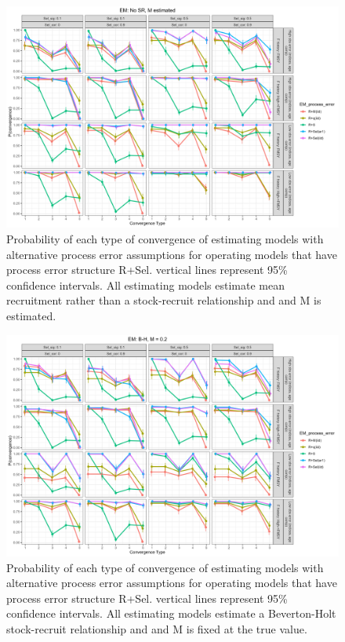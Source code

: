 \documentclass[
  12pt,
]{article}
\begin{document}
\begin{landscape}
\begin{figure}
\caption{Probability of each type of convergence of estimating models with alternative process error assumptions for operating models that have process error structure R+Sel. vertical lines represent 95\% confidence intervals. All estimating models estimate mean recruitment rather than a stock-recruit relationship and and M is estimated.}\label{Sel_om_em_R_ME_convergence}
\begin{center}
\includegraphics[width = \textwidth]{Sel_om_p_convergence_meanR_M_estimated.png}
\end{center}
\end{figure}
\end{landscape}

\begin{landscape}
\begin{figure}
\caption{Probability of each type of convergence of estimating models with alternative process error assumptions for operating models that have process error structure R+Sel. vertical lines represent 95\% confidence intervals. All estimating models estimate a Beverton-Holt stock-recruit relationship and and M is fixed at the true value.}\label{Sel_om_em_BH_MF_convergence}
\begin{center}
\includegraphics[width = \textwidth]{Sel_om_p_convergence_BH_M_fixed.png}
\end{center}
\end{figure}
\end{landscape}
\end{document}
